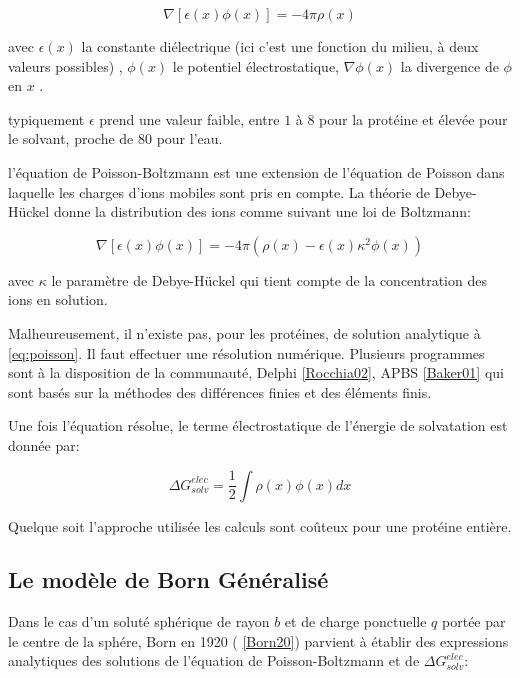 \begin{equation}
  \label{eq:poisson}
  \nabla [ \epsilon(x) \phi(x)] = - 4 \pi \rho(x)   
\end{equation}

avec $\epsilon(x)$ la constante diélectrique (ici c'est une fonction du milieu, à deux valeurs possibles) , $\phi (x)$ le potentiel électrostatique, $\nabla \phi(x)$ la divergence de $\phi$ en $x$ .

typiquement $\epsilon$ prend une valeur faible, entre $1$ à $8$ pour la protéine et élevée pour le solvant, proche de $80$ pour l'eau.

l'équation de Poisson-Boltzmann est une extension de l'équation de Poisson dans laquelle les charges d'ions mobiles sont pris en compte. La théorie de Debye-Hückel donne la distribution des ions comme suivant une loi de Boltzmann:

\begin{equation}
  \nabla [ \epsilon (x) \phi(x)] = -4 \pi ( \rho(x) - \epsilon(x) \kappa^2 \phi(x))
\end{equation}

avec $ \kappa $ le paramètre de Debye-Hückel qui tient compte de la concentration des ions en solution.


Malheureusement, il n'existe pas, pour les protéines, de solution analytique à \ref{eq:poisson}. Il faut effectuer une résolution numérique. Plusieurs programmes sont à la disposition de la communauté, Delphi \ref{Rocchia02}, APBS \ref{Baker01}  qui sont basés sur la méthodes des différences finies et des éléments finis.

Une fois l'équation résolue, le terme électrostatique de l'énergie de solvatation est donnée par:

\begin{equation}
\Delta G_{solv}^{elec} = \frac{1}{2} \int \rho(x)\phi(x)dx  
\end{equation}

Quelque soit l'approche utilisée les calculs sont coûteux pour une protéine entière.


\subsection{Le modèle de Born Généralisé}
\label{sub:GB}
Dans le cas d'un soluté sphérique de rayon $b$ et de charge ponctuelle $q$ portée par le centre de la sphére, Born en 1920 ( \ref{Born20}) parvient à établir des expressions analytiques des solutions de l'équation de Poisson-Boltzmann et de $ \Delta G_{solv}^{elec}$:


